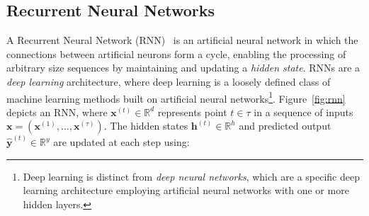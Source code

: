 


\subsection{Recurrent Neural Networks}

A Recurrent Neural Network (RNN)~\cite{Graves2012} is an artificial neural network in which the connections between artificial neurons form a cycle, enabling the processing of arbitrary size sequences by maintaining and updating a \emph{hidden state}.  RNNs are a \emph{deep learning} architecture, where deep learning is a loosely defined class of machine learning methods built on artificial neural networks\footnote{Deep learning is distinct from \emph{deep neural networks}, which are a specific deep learning architecture employing artificial neural networks with one or more hidden layers.}. Figure~\ref{fig:rnn} depicts an RNN, where $\bm{x}^{(t)} \in \mathbb{R}^d$ represents point $t \in \tau$ in a sequence of inputs $\bm{x} = \left( \bm{x}^{(1)}, \ldots, \bm{x}^{(\tau)} \right)$. The hidden states $\bm{h}^{(t)} \in \mathbb{R}^h$ and predicted output $\bm{\hat{y}}^{(t)} \in \mathbb{R}^y$ are updated at each step using:

